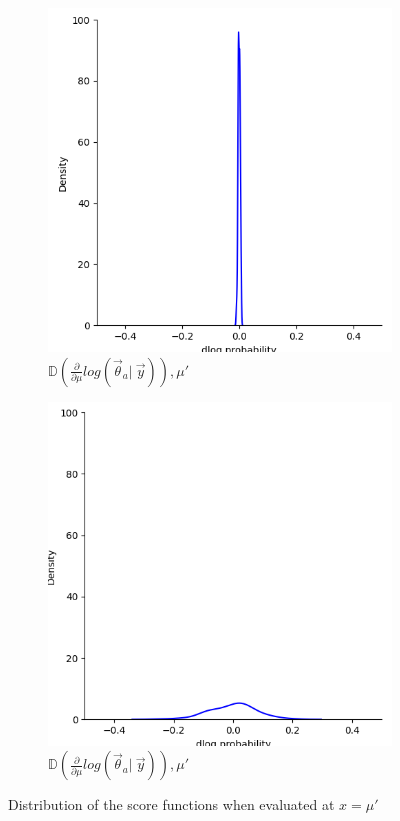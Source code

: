 \begin{figure}[H]
    \centering
    \begin{subfigure}{0.475\textwidth}
        \includegraphics[width=\textwidth]{figs/background/deriv_dist_10.png}
        \caption[]{$\mathbb{D}\left(\frac{\partial}{\partial\mu} log(\vec{\theta}_a |\ \vec{y})\right), \mu'$}
    \end{subfigure}
    \begin{subfigure}{0.475\textwidth}
        \includegraphics[width=\textwidth]{figs/background/deriv_dist_0.5.png}
        \caption[]{$\mathbb{D}\left(\frac{\partial}{\partial\mu} log(\vec{\theta}_a |\ \vec{y})\right), \mu'$}
    \end{subfigure}
    \caption{Distribution of the score functions when evaluated at $x=\mu'$}
    \label{fig:scorefunctiondist}
\end{figure}
